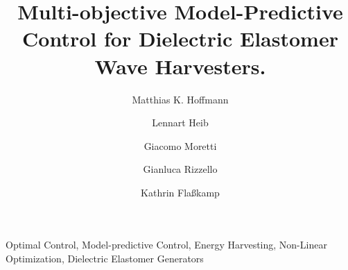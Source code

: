 \documentclass{ifacconf}
\begin{document}
	\begin{frontmatter}
		
		\title{Multi-objective Model-Predictive Control for Dielectric Elastomer Wave Harvesters.} 
		
		\author[First]{Matthias K. Hoffmann} 
		\author[First]{Lennart Heib} 
		\author[Second]{Giacomo Moretti}
		\author[Third]{Gianluca Rizzello}
		\author[First]{Kathrin Flaßkamp} 
		
		\address[First]{Systems Modeling and Simulation,\linebreak (e-mail:~\{{matthias.hoffmann, kathrin.flasskamp\}@uni-saarland.de, lennartheib@gmail.com})}
		\address[Second]{Università degli Studi di Trento, (e-mail:~giacomo.moretti@unitn.it)}
		\address[Third]{Intelligent Material Systems Lab,\linebreak
			(e-mail:~gianluca.rizzello@imsl.uni-saarland.de)
			\linebreak
			$^{*}$ and $^{***}$ from Saarland University, Saarbrücken, Germany.}
		
		\begin{abstract}                %
			
		\end{abstract}
		
		\begin{keyword}
			Optimal Control, Model-predictive Control, Energy Harvesting, Non-Linear Optimization, Dielectric Elastomer Generators
		\end{keyword}
		
	\end{frontmatter}
	
	
	
	
	
	
	
	
	
\end{document}
